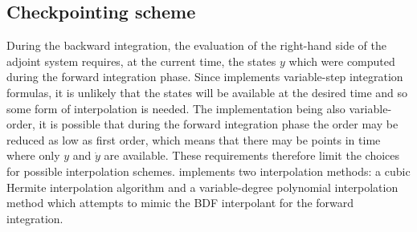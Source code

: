 \subsection{Checkpointing scheme}\label{ss:checkpointing}
During the backward integration, the evaluation of the right-hand side
of the adjoint system requires, at the current time, the states $y$ which
were computed during the forward integration phase.
Since {\idas} implements variable-step integration formulas,
it is unlikely that the states will be available at the desired time and
so some form of interpolation is needed. The {\idas} implementation
being also variable-order, it is possible that during the forward
integration phase the order may be reduced as low as first order,
which means that there may be points in time where only $y$ and ${\dot y}$
are available. These requirements therefore limit the choices for possible
interpolation schemes.
{\idas} implements two interpolation methods: a cubic Hermite interpolation
algorithm and a variable-degree polynomial interpolation method which attempts
to mimic the BDF interpolant for the forward integration.

